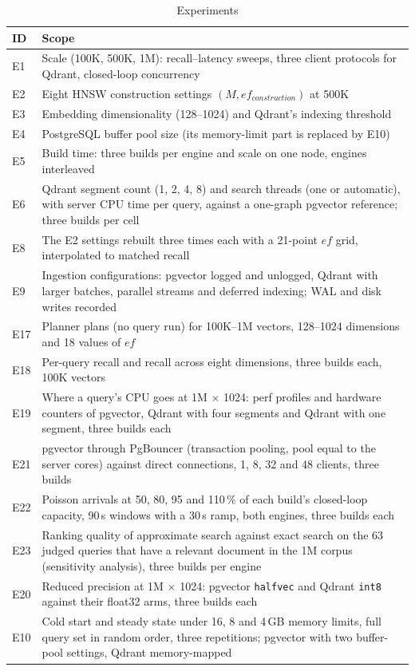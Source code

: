 \documentclass[sigconf, nonacm]{acmart}
\begin{document}
\begin{table}[t]
  \caption{Experiments}
  \label{tab:expmap}
  \small
  \begin{tabular}{p{}p{}}
    \toprule
    ID & Scope \\
    \midrule
    E1 & Scale (100K, 500K, 1M): recall--latency sweeps, three client protocols for Qdrant,
         closed-loop concurrency \\
    E2 & Eight HNSW construction settings $(M, ef_{construction})$ at 500K \\
    E3 & Embedding dimensionality (128--1024) and Qdrant's indexing threshold \\
    E4 & PostgreSQL buffer pool size (its memory-limit part is replaced by E10) \\
    E5 & Build time: three builds per engine and scale on one node, engines interleaved \\
    E6 & Qdrant segment count (1, 2, 4, 8) and search threads (one or automatic), with
         server CPU time per query, against a one-graph pgvector reference; three builds
         per cell \\
    E8 & The E2 settings rebuilt three times each with a 21-point $ef$ grid, interpolated
         to matched recall \\
    E9 & Ingestion configurations: pgvector logged and unlogged, Qdrant with larger
         batches, parallel streams and deferred indexing; WAL and disk writes recorded \\
    E17 & Planner plans (no query run) for 100K--1M vectors, 128--1024 dimensions and 18 values of $ef$ \\
    E18 & Per-query recall and recall across eight dimensions, three builds each, 100K vectors \\
    E19 & Where a query's CPU goes at 1M $\times$ 1024: perf profiles and hardware counters of pgvector,
         Qdrant with four segments and Qdrant with one segment, three builds each \\
    E21 & pgvector through PgBouncer (transaction pooling, pool equal to the server cores) against direct connections,
         1, 8, 32 and 48 clients, three builds \\
    E22 & Poisson arrivals at 50, 80, 95 and 110\,\% of each build's closed-loop capacity, 90\,s windows with a 30\,s ramp,
         both engines, three builds each \\
    E23 & Ranking quality of approximate search against exact search on the 63 judged queries that have a relevant
         document in the 1M corpus (sensitivity analysis), three builds per engine \\
    E20 & Reduced precision at 1M $\times$ 1024: pgvector \texttt{halfvec} and Qdrant \texttt{int8}
         against their float32 arms, three builds each \\
    E10 & Cold start and steady state under 16, 8 and 4\,GB memory limits, full query set in random
         order, three repetitions; pgvector with two buffer-pool settings, Qdrant memory-mapped \\
    \bottomrule
  \end{tabular}
\end{table}
\end{document}
